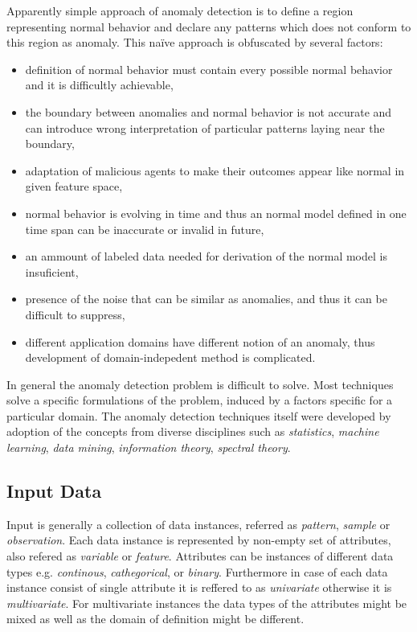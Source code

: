 Apparently simple approach of anomaly detection is to define a region representing 
normal behavior and declare any patterns which does not conform to this region as anomaly. 
This na\"ive approach is obfuscated by several factors:
\begin{itemize}
	\item definition of normal behavior must contain every possible normal behavior 
	and it is difficultly achievable,
	\item the boundary between anomalies and normal behavior is not accurate and 
	can introduce wrong interpretation	of particular patterns laying near the boundary,
	\item adaptation of malicious agents to make their outcomes appear like normal in 
	given feature space,
	\item normal behavior is evolving in time and thus an normal model defined in one time span 
	can be inaccurate or invalid in future,
	\item an ammount of labeled data needed for derivation of the normal model is insuficient,
	\item presence of the noise that can  be similar as anomalies, and thus it 
	can be difficult to suppress,
	\item different application domains have different notion of an anomaly, 
	thus development of domain-indepedent method is complicated.
\end{itemize}

In general the anomaly detection problem is difficult to solve. 
Most techniques solve a specific formulations of the problem, induced by a 
factors specific for a particular domain. The anomaly detection techniques itself
were developed by adoption of the concepts from diverse disciplines such as \emph{statistics}, 
\emph{machine learning}, \emph{data mining}, \emph{information theory}, \emph{spectral theory}.

\subsection{Input Data}

Input is generally a collection of data instances, referred as \emph{pattern}, 
\emph{sample} or \emph{observation}.
Each data instance is represented by non-empty set of attributes, also refered as 
\emph{variable} or \emph{feature}.
Attributes can be instances of different data types e.g. \emph{continous}, 
\emph{cathegorical}, or \emph{binary}.
Furthermore in case of each data instance consist of single attribute it is reffered to as
\emph{univariate} otherwise it is \emph{multivariate}. 
For multivariate instances the data types of the attributes might be mixed as well as 
the domain of definition might be different.


